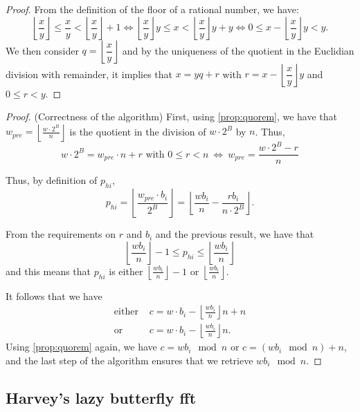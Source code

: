 \documentclass[a4paper]{article}
\begin{document}
\begin{proof}
From the definition of the floor of a rational number, we have:
\[
    \left\lfloor\dfrac{x}{y}\right\rfloor \leq \dfrac{x}{y} < \left\lfloor\dfrac{x}{y}\right\rfloor + 1 \Longleftrightarrow
    \left\lfloor\dfrac{x}{y}\right\rfloor y \leq x < \left\lfloor\dfrac{x}{y}\right\rfloor y + y \Longleftrightarrow
    0 \leq x - \left\lfloor\dfrac{x}{y}\right\rfloor y < y.
\]
We then consider $q=\left\lfloor\dfrac{x}{y}\right\rfloor$ and by the uniqueness of the quotient in the Euclidian division with remainder, 
it implies that $x = yq + r$ with $r=x - \left\lfloor\dfrac{x}{y}\right\rfloor y$ and $0 \leq r < y$.
\end{proof}

\begin{proof} (Correctness of the algorithm)
First, using \autoref{prop:quorem}, we have that $w_{pre}= \left\lfloor\frac{w\cdot 2^B}{n}\right\rfloor $ is the quotient in the division 
of $w\cdot 2^B$ by $n$. Thus,
\[
    w\cdot 2^B = w_{pre}\cdot n + r \text{ with } 0 \leq r < n\ \Longleftrightarrow\ w_{pre} = \dfrac{w\cdot 2^B - r}{n}
\]

Thus, by definition of $p_{hi}$,
\[
p_{hi} = \left\lfloor\frac{w_{pre}\cdot b_i}{2^B}\right\rfloor
= \left\lfloor\dfrac{wb_i}{n} - \dfrac{rb_i}{n\cdot 2^B} \right\rfloor.
\]

From the requirements on $r$ and $b_i$ and the previous result, we have that
\[
\left\lfloor\dfrac{wb_i}{n}\right\rfloor - 1 \leq p_{hi} \leq \left\lfloor\dfrac{wb_i}{n}\right\rfloor
\]
and this means that $p_{hi}$ is either $\left\lfloor\frac{wb_i}{n}\right\rfloor - 1$ or $\left\lfloor\frac{wb_i}{n}\right\rfloor$.


It follows that we have
\begin{align*}
\text{either } &c=w\cdot b_i - \left\lfloor\frac{wb_i}{n}\right\rfloor n + n \\
\text{or } &c=w\cdot b_i - \left\lfloor\frac{wb_i}{n}\right\rfloor n.
\end{align*}
Using \autoref{prop:quorem} again, we have $c=wb_i \mod n$ or $c=(wb_i \mod n)+n$, and the last step of the algorithm ensures 
that we retrieve $wb_i \mod n$.
\end{proof}

\subsection{Harvey's lazy butterfly fft}
\end{document}
